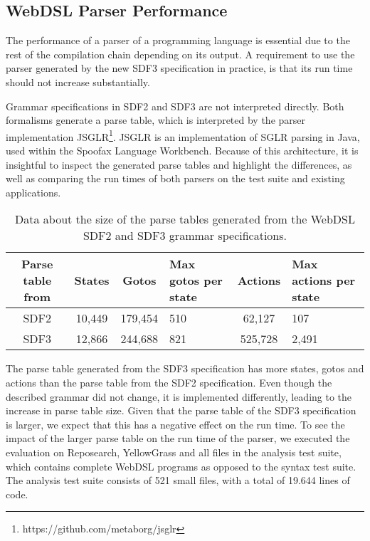   \subsection{WebDSL Parser Performance}

    The performance of a parser of a programming language is essential due to the rest of the compilation chain depending on its output. A requirement to use the parser generated by the new SDF3 specification in practice, is that its run time should not increase substantially.

    Grammar specifications in SDF2 and SDF3 are not interpreted directly. Both formalisms generate a parse table, which is interpreted by the parser implementation JSGLR\footnote{https://github.com/metaborg/jsglr}. JSGLR is an implementation of SGLR parsing in Java, used within the Spoofax Language Workbench. Because of this architecture, it is insightful to inspect the generated parse tables and highlight the differences, as well as comparing the run times of both parsers on the test suite and existing applications.

    \begin{table}[h]
      \centering
      \begin{tabular}{ |c||c | c | p{2cm} | c | p{2.2cm}| }
        \hline
        Parse table from & States & Gotos & Max gotos per state & Actions & Max actions per state \\
        \hline\hline
        SDF2 & 10,449 & 179,454 & 510 & 62,127 & 107 \\
        \hline
        SDF3 & 12,866 & 244,688 & 821 & 525,728 & 2,491 \\
        \hline
      \end{tabular}
      \caption{\label{tbl:parse-table-differences}Data about the size of the parse tables generated from the WebDSL SDF2 and SDF3 grammar specifications.}
    \end{table}

    The parse table generated from the SDF3 specification has more states, gotos and actions than the parse table from the SDF2 specification. Even though the described grammar did not change, it is implemented differently, leading to the increase in parse table size. Given that the parse table of the SDF3 specification is larger, we expect that this has a negative effect on the run time. To see the impact of the larger parse table on the run time of the parser, we executed the evaluation on Reposearch, YellowGrass and all files in the analysis test suite, which contains complete WebDSL programs as opposed to the syntax test suite. The analysis test suite consists of 521 small files, with a total of 19.644 lines of code.

